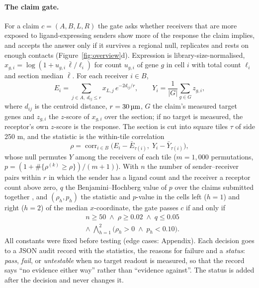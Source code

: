 \documentclass[letterpaper]{article} %
\newcommand{\um}{\ifmmode\,\text{\textmu m}\else\,\textmu m\fi}
\begin{document}
\paragraph{The claim gate.} For a claim $c=(A,B,L,R)$ the gate asks whether receivers that are more exposed to
ligand-expressing senders show more of the response the claim implies, and accepts the answer only if it survives a
regional null, replicates and rests on enough contacts (Figure~\ref{fig:overview}d). Expression is
library-size-normalised, $x_{g,i}=\log(1+u_{g,i}\,\bar\ell/\ell_i)$ for count $u_{g,i}$ of gene $g$ in cell $i$ with
total count $\ell_i$ and section median $\bar\ell$. For each receiver $i\in B$,
\begin{equation}
E_i=\sum_{j\in A,\;d_{ij}\le r} x_{L,j}\,e^{-2d_{ij}/r},\qquad Y_i=\frac{1}{|G|}\sum_{g\in G} z_{g,i},
\label{eq:exposure}
\end{equation}
where $d_{ij}$ is the centroid distance, $r=30\um$, $G$ the claim's measured target genes and $z_{g,i}$ the $z$-score
of $x_{g,i}$ over the section; if no target is measured, the receptor's own $z$-score is the response. The section is
cut into square tiles $\tau$ of side 250\um, and the statistic is the within-tile correlation
\begin{equation}
\rho=\operatorname{corr}_{i\in B}\bigl(E_i-\bar E_{\tau(i)},\;Y_i-\bar Y_{\tau(i)}\bigr),
\label{eq:stat}
\end{equation}
whose null permutes $Y$ among the receivers of each tile ($m=1{,}000$ permutations,
$p=(1+\#\{\rho^{(k)}\geq\rho\})/(m+1)$). With $n$ the number of sender--receiver pairs within $r$ in which the sender
has a ligand count and the receiver a receptor count above zero, $q$ the Benjamini--Hochberg value of $p$ over the
claims submitted together \cite{benjamini1995}, and $(\rho_h,p_h)$ the statistic and $p$-value in the cells left
($h=1$) and right ($h=2$) of the median $x$-coordinate, the gate passes $c$ if and only if
\begin{equation}
\begin{aligned}
&n\geq50\;\wedge\;\rho\geq0.02\;\wedge\;q\leq0.05\\
&\wedge\;\textstyle\bigwedge_{h=1}^{2}\bigl(\rho_h>0\;\wedge\;p_h<0.10\bigr).
\end{aligned}
\label{eq:pass}
\end{equation}
All constants were fixed before testing (edge cases: Appendix). Each decision goes to a JSON audit record with the
statistics, the reasons for failure and a \emph{status}: \emph{pass}, \emph{fail}, or \emph{untestable} when no target
readout is measured, so that the record says ``no evidence either way'' rather than ``evidence against''. The status is
added after the decision and never changes it.
\end{document}
